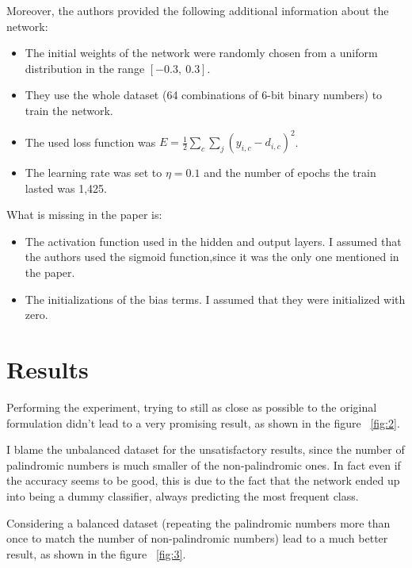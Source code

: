 \documentclass{article}
\begin{document}
    Moreover, the authors provided the following additional information about the network:

    \begin{itemize}
        \itemsep0em %
        \item The initial weights of the network were randomly chosen from a uniform distribution in the range $[-0.3,\ 0.3]$.
        \item They use the whole dataset (64 combinations of 6-bit binary numbers) to train the network.
        \item The used loss function was $E = \frac{1}{2}\sum_{c}\sum_{j}{\left(y_{i,c} - d_{i,c}\right)^2}$.
        \item The learning rate was set to $\eta = 0.1$ and the number of epochs the train lasted was 1,425.
    \end{itemize}

    What is missing in the paper is:

    \begin{itemize}
        \itemsep0em %
        \item The activation function used in the hidden and output layers.
            I assumed that the authors used the sigmoid function,since it was the only one mentioned in the paper.
        \item The initializations of the bias terms.
            I assumed that they were initialized with zero.
    \end{itemize}

    \section{Results}\label{sec:results}

    Performing the experiment, trying to still as close as possible to the original formulation didn't lead
    to a very promising result, as shown in the figure ~\ref{fig:2}.

    \noindent I blame the unbalanced dataset for the unsatisfactory results, since the number of palindromic numbers is much smaller
    of the non-palindromic ones.
    In fact even if the accuracy seems to be good, this is due to the fact that the network
    ended up into being a dummy classifier, always predicting the most frequent class.

    \noindent Considering a balanced dataset (repeating the palindromic numbers more than once to match the number of non-palindromic numbers)
    lead to a much better result, as shown in the figure ~\ref{fig:3}.
\end{document}
